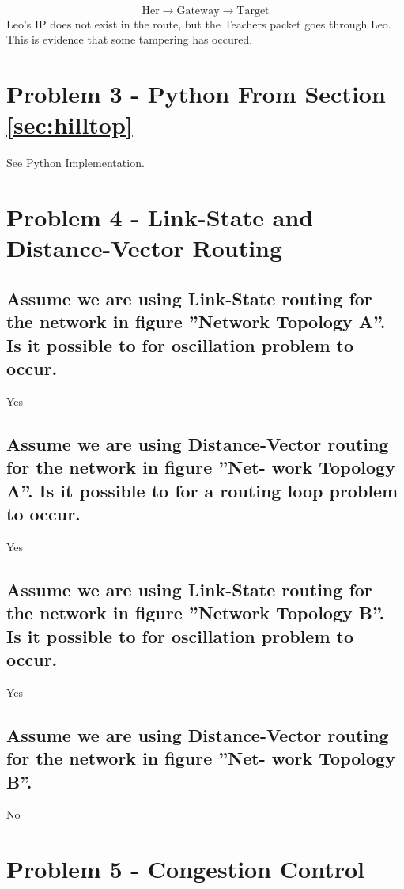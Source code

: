 \documentclass{article}
\begin{document}
	\[
		\text{Her} \xrightarrow{} \text{Gateway} \xrightarrow{} \text{Target}
	\]
	Leo's IP does not exist in the route, but the Teachers packet goes through Leo.
	This is evidence that some tampering has occured.

\section{Problem 3 - Python From Section \ref{sec:hilltop}}

See Python Implementation.

\section{Problem 4 - Link-State and Distance-Vector Routing}

\subsection{Assume we are using Link-State routing for the network in figure  ”Network
Topology A”. Is it possible to for oscillation problem to occur.}

Yes

\subsection{Assume we are using Distance-Vector routing for the network in figure ”Net-
work Topology A”. Is it possible to for a routing loop problem to occur.}

Yes

\subsection{Assume we are using Link-State routing for the network in figure ”Network
Topology B”. Is it possible to for oscillation problem to occur.}

Yes

\subsection{Assume we are using Distance-Vector routing for the network in figure ”Net-
work Topology B”.}

No

\section{Problem 5 - Congestion Control}
\end{document}
